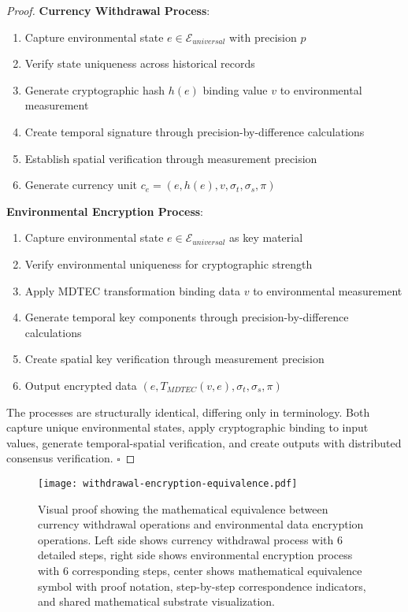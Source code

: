 \documentclass[12pt,a4paper]{article}
\begin{document}
\begin{proof}
\textbf{Currency Withdrawal Process}:
\begin{enumerate}
\item Capture environmental state $e \in \mathcal{E}_{universal}$ with precision $p$
\item Verify state uniqueness across historical records
\item Generate cryptographic hash $h(e)$ binding value $v$ to environmental measurement
\item Create temporal signature through precision-by-difference calculations
\item Establish spatial verification through measurement precision
\item Generate currency unit $c_e = (e, h(e), v, \sigma_t, \sigma_s, \pi)$
\end{enumerate}

\textbf{Environmental Encryption Process}:
\begin{enumerate}
\item Capture environmental state $e \in \mathcal{E}_{universal}$ as key material
\item Verify environmental uniqueness for cryptographic strength
\item Apply MDTEC transformation binding data $v$ to environmental measurement
\item Generate temporal key components through precision-by-difference calculations
\item Create spatial key verification through measurement precision
\item Output encrypted data $(e, T_{MDTEC}(v,e), \sigma_t, \sigma_s, \pi)$
\end{enumerate}

The processes are structurally identical, differing only in terminology. Both capture unique environmental states, apply cryptographic binding to input values, generate temporal-spatial verification, and create outputs with distributed consensus verification. $\square$
\end{proof}

\begin{figure}[H]
\centering
\texttt{[image: withdrawal-encryption-equivalence.pdf]}
\caption{Visual proof showing the mathematical equivalence between currency withdrawal operations and environmental data encryption operations. Left side shows currency withdrawal process with 6 detailed steps, right side shows environmental encryption process with 6 corresponding steps, center shows mathematical equivalence symbol with proof notation, step-by-step correspondence indicators, and shared mathematical substrate visualization.}
\label{fig:withdrawal_encryption_equivalence}
\end{figure}
\end{document}
